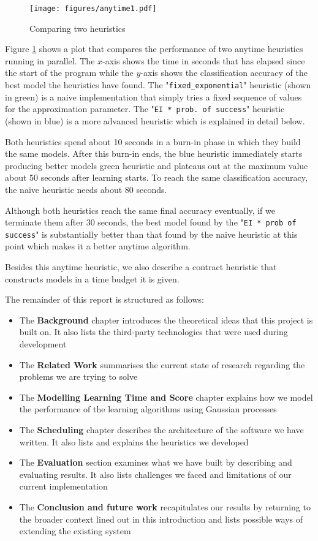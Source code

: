 \documentclass[a4paper,12pt,twoside,openright]{report}
\begin{document}
\begin{figure}
\centering
  \texttt{[image: figures/anytime1.pdf]}
  \caption{Comparing two heuristics}
  \label{anytime1}
\end{figure}


Figure \ref{anytime1} shows a plot that compares the performance of two anytime heuristics running in parallel. The $x$-axis shows the time in seconds that has elapsed since the start of the program while the $y$-axis shows the classification accuracy of the best model the heuristics have found. The "\texttt{fixed\_exponential}" heuristic (shown in green) is a naive implementation that simply tries a fixed sequence of values for the approximation parameter. The "\texttt{EI * prob.\ of success}" heuristic (shown in blue) is a more advanced heuristic which is explained in detail below. 

Both heuristics spend about 10 seconds in a burn-in phase in which they build the same models. After this burn-in ends, the blue heuristic immediately starts producing better models green heuristic and plateaus out at the maximum value about 50 seconds after learning starts. To reach the same classification accuracy, the naive heuristic needs about 80 seconds.

Although both heuristics reach the same final accuracy eventually, if we terminate them after 30 seconds, the best model found by the "\texttt{EI * prob of success}" is substantially better than that found by the naive heuristic at this point which makes it a better anytime algorithm. 

Besides this anytime heuristic, we also describe a contract heuristic that constructs models in a time budget it is given.


The remainder of this report is structured as follows:
\begin{itemize}
	\item The \textbf{Background} chapter introduces the theoretical ideas that this project is built on. It also lists the third-party technologies that were used during development
	\item The \textbf{Related Work} summarises the current state of research regarding the problems we are trying to solve
	\item The \textbf{Modelling Learning Time and Score} chapter explains how we model the performance of the learning algorithms using Gaussian processes
	\item The \textbf{Scheduling} chapter describes the architecture of the software we have written. It also lists and explains the heuristics we developed
	\item The \textbf{Evaluation} section examines what we have built by describing and evaluating results. It also lists challenges we faced and limitations of our current implementation
	\item The \textbf{Conclusion and future work} recapitulates our results by returning to the broader context lined out in this introduction and lists possible ways of extending the existing system
\end{itemize}
\end{document}

